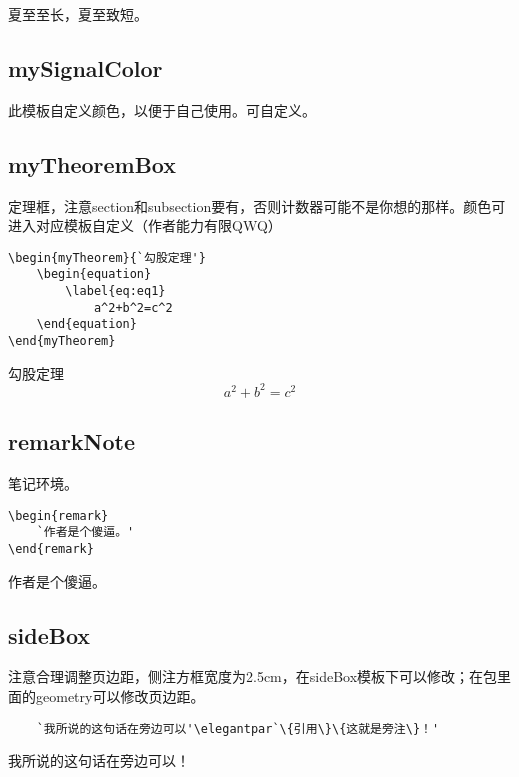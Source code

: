 \documentclass{ctexart}
\begin{document}
    \begin{myReference}
        夏至至长，夏至致短。
    \end{myReference}
    
    \subsection{mySignalColor}
    此模板自定义颜色，以便于自己使用。可自定义。

    \subsection{myTheoremBox}
    
    定理框，注意section和subsection要有，否则计数器可能不是你想的那样。颜色可进入对应模板自定义（作者能力有限QWQ）

    
    \begin{lstlisting}
\begin{myTheorem}{`勾股定理'}
    \begin{equation}
        \label{eq:eq1}
            a^2+b^2=c^2
    \end{equation}
\end{myTheorem}
    \end{lstlisting}
    
    \begin{myTheorem}{勾股定理}
        \begin{equation}
            \label{eq:eq1}
                a^2+b^2=c^2
        \end{equation}
    \end{myTheorem}

    \subsection{remarkNote}
    笔记环境。
    
    \begin{lstlisting}
\begin{remark}
    `作者是个傻逼。'
\end{remark}
    \end{lstlisting}
    
    \begin{remark}
        作者是个傻逼。
    \end{remark}
    
\subsection{sideBox}
注意合理调整页边距，侧注方框宽度为2.5cm，在sideBox模板下可以修改；在包里面的geometry可以修改页边距。
\begin{lstlisting}
    `我所说的这句话在旁边可以'\elegantpar`\{引用\}\{这就是旁注\}！'
\end{lstlisting}

我所说的这句话在旁边可以！
\end{document}
